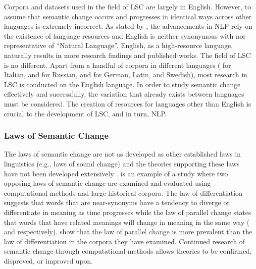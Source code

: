 Corpora and datasets used in the field of LSC are largely in English. However, to assume that semantic change occurs and progresses in identical ways across other languages is extremely incorrect. As stated by \citet{bender_2020}, the advancements in NLP rely on the existence of language resources and English is neither synonymous with nor representative of “Natural Language”. English, as a high-resource language, naturally results in more research findings and published works. The field of LSC is no different. Apart from a handful of corpora in different languages (\citet{diacrita_evalita2020} for Italian, \citet{rodina-kutuzov-2020-rusemshift} and \citet{rushifteval2021} for Russian, and \citet{schlechtweg-etal-2020-semeval} for German, Latin, and Swedish), most research in LSC is conducted on the English language. In order to study semantic change effectively and successfully, the variation that already exists between languages must be considered. The creation of resources for languages other than English is crucial to the development of LSC, and in turn, NLP.   


\subsubsection{Laws of Semantic Change}

The laws of semantic change are not as developed as other established laws in linguistics (e.g., laws of sound change) and the theories supporting these laws have not been developed extensively \citep{Xu2015ACE}. \citet{Xu2015ACE} is an example of a study where two opposing laws of semantic change are examined and evaluated using computational methods and large historical corpora. The law of differentiation suggests that words that are near-synonyms have a tendency to diverge or differentiate in meaning as time progresses while the law of parallel change states that words that have related meanings will change in meaning in the same way (\citet{breal1897essai} and \citet{stern-1921} respectively). \citet{Xu2015ACE} show that the law of parallel change is more prevalent than the law of differentiation in the corpora they have examined. Continued research of semantic change through computational methods allows theories to be confirmed, disproved, or improved upon. 

